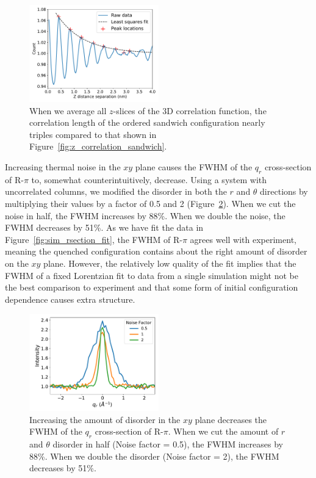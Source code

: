 \documentclass[journal=jpcbfk,manuscript=article]{achemso}
\begin{document}
  \begin{figure}
  \centering
  \includegraphics[width=0.5\textwidth]{z_correlation_fullbox.pdf}
  \caption{When we average all $z$-slices of the 3D correlation function, the 
  correlation length of the ordered sandwich configuration nearly triples compared 
  to that shown in Figure~\ref{fig:z_correlation_sandwich}.}\label{fig:z_correlation_fullbox}
  \end{figure}
 
  Increasing thermal noise in the $xy$ plane causes the FWHM of the $q_r$
  cross-section of R-$\pi$ to, somewhat counterintuitively, decrease. Using a
  system with uncorrelated columns, we modified the disorder in both the $r$ and
  $\theta$ directions by multiplying their values by a factor of 0.5 and 2
  (Figure~\ref{fig:qy_fwhm}). When we cut the noise in half, the FWHM increases
  by 88\%. When we double the noise, the FWHM decreases by 51\%. As we have fit
  the data in Figure~\ref{fig:sim_rsection_fit}, the FWHM of R-$\pi$ agrees well
  with experiment, meaning the quenched configuration contains about the right
  amount of disorder on the $xy$ plane. However, the relatively low quality of
  the fit implies that the FWHM of a fixed Lorentzian fit to data from a single
  simulation might not be the best comparison to experiment and that some form of
  initial configuration dependence causes extra structure.

  \begin{figure}
  \centering
  \includegraphics[width=0.5\textwidth]{qy_fwhm.pdf}
  \caption{Increasing the amount of disorder in the $xy$ plane decreases the
	  FWHM of the $q_r$ cross-section of R-$\pi$. When we cut the amount of $r$ and
	  $\theta$ disorder in half (Noise factor = 0.5), the FWHM increases by 88\%. When
	  we double the disorder (Noise factor = 2), the FWHM decreases by
	  51\%.}\label{fig:qy_fwhm}
  \end{figure}
  
\end{document}
